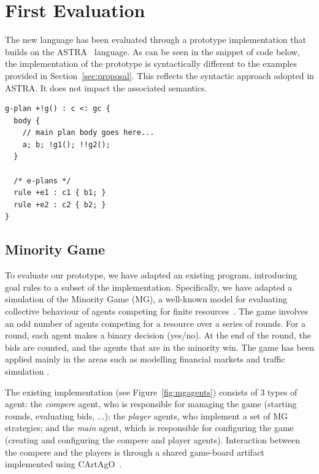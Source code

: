\section{First Evaluation}
\label{sec:evaluation}
The new language has been evaluated through a prototype implementation that builds on 
the ASTRA~\cite{DBLP:conf/prima/CollierRL15} language.  As can be seen in the snippet 
of code below, the implementation of the {\aser} prototype is syntactically different 
to the examples provided in Section~\ref{sec:proposal}. This reflects the syntactic 
approach adopted in ASTRA. It does not impact the associated semantics.

{\small
\begin{verbatim}
g-plan +!g() : c <: gc { 
  body {
    // main plan body goes here...
    a; b; !g1(); !!g2();
  }

  /* e-plans */
  rule +e1 : c1 { b1; }
  rule +e2 : c2 { b2; }
}
\end{verbatim}}

\subsection{Minority Game}
\label{minority}
To evaluate our prototype, we have adapted an existing program, introducing {\aser} goal
rules to a subset of the implementation. Specifically, we have adapted a simulation of
the Minority Game (MG), a well-known model for evaluating collective behaviour of agents competing 
for finite resources~\cite{moro2004minority}. The game involves an odd number of
agents competing for a resource over a series of rounds. For a round, each agent makes a binary
decision (yes/no). At the end of the round, the bids are counted, and the agents that are in the
minority win. The game has been applied mainly in the areas such as modelling financial markets 
\cite{challet2013minority} and traffic simulation \cite{chmura2004minority}.

The existing implementation (see Figure~\ref{fig:mgagents}) consists of 3 types of agent: the 
\emph{compere} agent, who is responsible for managing the game (starting rounds, evaluating bids,
 ...); the \emph{player} agents, who implement a set of MG strategies; and the \emph{main} agent, 
 which is responsible for configuring the game (creating and configuring the compere and player 
 agents). Interaction between the compere and the players is through a shared game-board artifact 
 implemented using CArtAgO~\cite{RicciEPC}.

